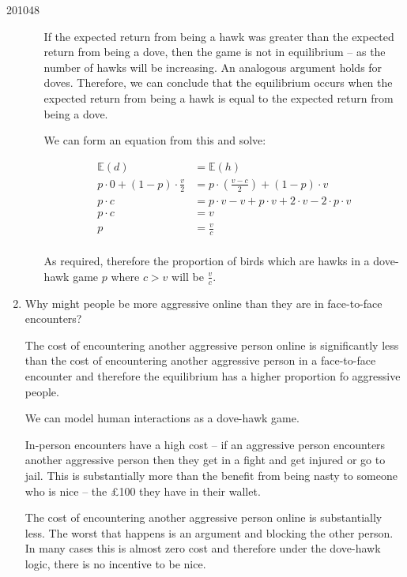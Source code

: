 \documentclass[a4paper]{article}
\begin{document}
\begin{examquestion}{2010}{4}{8}
\begin{enumerate}[label=(\alph*)]
\begin{enumerate}[label=(\roman*)]
If the expected return from being a hawk was greater than the expected
return from being a dove, then the game is not in equilibrium -- as the
number of hawks will be increasing. An analogous argument holds for doves.
Therefore, we can conclude that the equilibrium occurs when the expected
return from being a hawk is equal to the expected return from being a dove.

We can form an equation from this and solve:

\[
\begin{split}
\mathbb{E}(d)
&= \mathbb{E}(h) \\
p\cdot 0 + (1 - p) \cdot \frac{v}{2}
&= p \cdot \left( \frac{v - c}{2} \right) + (1 - p) \cdot v \\
p \cdot c &= p\cdot v - v + p \cdot v + 2 \cdot v - 2 \cdot p \cdot v \\
p \cdot c &= v \\
p &= \frac{v}{c} \\
\end{split}
\]

As required, therefore the proportion of birds which are hawks in a
dove-hawk game $p$ where $c > v$ will be $\frac{v}{c}$.

\end{enumerate}

\item Why might people be more aggressive online than they are in
face-to-face encounters?

The cost of encountering another aggressive person online is significantly
less than the cost of encountering another aggressive person in a
face-to-face encounter and therefore the equilibrium has a higher proportion
fo aggressive people.

We can model human interactions as a dove-hawk game.

In-person encounters have a high cost -- if an aggressive person encounters
another aggressive person then they get in a fight and get injured or go
to jail. This is substantially more than the benefit from being nasty to
someone who is nice -- the \pounds 100 they have in their wallet.

The cost of encountering another aggressive person online is substantially
less. The worst that happens is an argument and blocking the other person.
In many cases this is almost zero cost and therefore under the dove-hawk
logic, there is no incentive to be nice.

\end{enumerate}

\end{examquestion}
\end{document}
